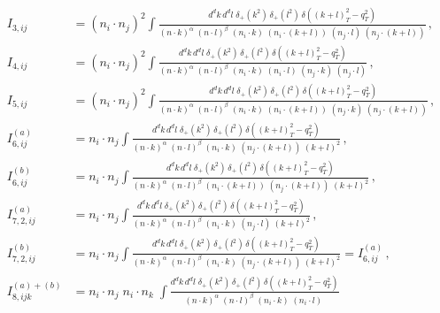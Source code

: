 \documentclass[a4paper,11pt]{report}
\numberwithin{equation}{section}
\begin{document}
\begin{subequations}
  \label{eq:fullset-kl}
  \begin{align}
    I_{3, ij} &= 
    (n_i \cdot n_j)^2
    \int 
    \frac{d^d k\, d^d l\;\delta_+(k^2)\, \delta_+(l^2)\,\delta((k+l)_T^2-q_T^2)}
      {(n \cdot k)^\alpha\; (n \cdot l)^\beta \; 
      (n_i \cdot k) \; (n_i \cdot (k+l)) \; (n_j \cdot l) \; (n_j \cdot (k+l))} \, ,
    \\[0.7em]
    I_{4, ij} &= 
    (n_i \cdot n_j)^2
    \int 
    \frac{d^d k\, d^d l\;\delta_+(k^2)\, \delta_+(l^2)\,\delta((k+l)_T^2-q_T^2)}
      {(n \cdot k)^\alpha\; (n \cdot l)^\beta \;
      (n_i \cdot k) \; (n_i \cdot l) \;
      (n_j \cdot k) \; (n_j \cdot l)} \, ,
    \\[0.7em]
    I_{5, ij} &=
    (n_i \cdot n_j)^2
    \int 
    \frac{d^d k\, d^d l\;\delta_+(k^2)\, \delta_+(l^2)\,\delta((k+l)_T^2-q_T^2)}
      {(n \cdot k)^\alpha\; (n \cdot l)^\beta  \;
      (n_i \cdot k) \; (n_i \cdot (k+l)) \; 
      (n_j \cdot k) \; (n_j \cdot (k+l))} \, , 
    \\[0.7em]
    I^{(a)}_{6,ij} &=
    n_i \cdot n_j
     \int 
    \frac{d^d k\, d^d l\;\delta_+(k^2)\, \delta_+(l^2)\,\delta((k+l)_T^2-q_T^2)}
      {(n \cdot k)^\alpha\; (n \cdot l)^\beta  \;
      (n_i \cdot k) \; (n_j \cdot (k+l)) \; (k+l)^2} \, , 
    \\[0.7em]
    I^{(b)}_{6,ij} &=
    n_i \cdot n_j
    \int 
    \frac{d^d k\, d^d l\;\delta_+(k^2)\, \delta_+(l^2)\,\delta((k+l)_T^2-q_T^2)}
      {(n \cdot k)^\alpha\; (n \cdot l)^\beta  \;
      (n_i \cdot (k+l)) \; (n_j \cdot (k+l)) \; (k+l)^2} \, , 
    \\[0.7em]
    I^{(a)}_{7,2, ij} &=
    n_i \cdot n_j
    \int 
    \frac{d^d k\, d^d l\;\delta_+(k^2)\, \delta_+(l^2)\,\delta((k+l)_T^2-q_T^2)}
      {(n \cdot k)^\alpha\; (n \cdot l)^\beta  \;
      (n_i \cdot k) \;  (n_j \cdot l) \; (k+l)^2} \, ,
    \\[0.7em]
    I^{(b)}_{7,2, ij} &=
    n_i \cdot n_j
    \int 
    \frac{d^d k\, d^d l\;\delta_+(k^2)\, \delta_+(l^2)\,\delta((k+l)_T^2-q_T^2)}
      {(n \cdot k)^\alpha\; (n \cdot l)^\beta  \;
      (n_i \cdot k) \; (n_j \cdot (k+l)) \; (k+l)^2} = I^{(a)}_{6,ij}\, ,
    \\[0.7em]
    I_{8, ijk}^{(a)+(b)} &= 
    n_i \cdot n_j\; n_i \cdot n_k\; 
    \int 
    \frac{d^d k\, d^d l\;\delta_+(k^2)\, \delta_+(l^2)\,\delta((k+l)_T^2-q_T^2)}
      {(n \cdot k)^\alpha\; (n \cdot l)^\beta \; 
      (n_i \cdot k) \; (n_i \cdot l) \; 
}
\end{align}
\end{subequations}
\end{document}
